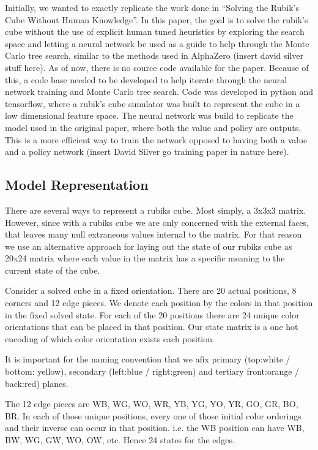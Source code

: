 \documentclass[10pt,twocolumn,letterpaper]{article}
\begin{document}
Initially, we wanted to exactly replicate the work done in “Solving the Rubik’s Cube Without Human Knowledge”. In this paper, the goal is to solve the rubik's cube without the use of explicit human tuned heuristics by exploring the search space and letting a neural network be used as a guide to help through the Monte Carlo tree search, similar to the methods used in AlphaZero (insert david silver stuff here). As of now, there is no source code available for the paper. Because of this, a code base needed to be developed to help iterate through the neural network training and Monte Carlo tree search. Code was developed in python and tensorflow, where a rubik's cube simulator was built to represent the cube in a low dimensional feature space. The neural network was build to replicate the model used in the original paper, where both the value and policy are outputs. This is a more efficient way to train the network opposed to having both a value and a policy network (insert David Silver go training paper in nature here).

\subsection{Model Representation}
There are several ways to represent a rubiks cube.  Most simply, a 3x3x3 matrix.  However, since with a rubiks cube we are only concerned with the external faces, that leaves many null extraneous values internal to the matrix.   For that reason we use an alternative approach for laying out the state of our rubiks cube as 20x24 matrix where each value in the matrix has a specific meaning to the current state of the cube. 

Consider a solved cube in a fixed orientation.  There are 20 actual positions, 8 corners and 12 edge pieces.  We denote each position by the colors in that position in the fixed solved state.  For each of the 20 positions there are 24 unique color orientations that can be placed in that position.  Our state matrix is a one hot encoding of which color orientation exists each position. 

It is important for the naming convention that we afix primary (top:white / bottom: yellow), secondary (left:blue / right:green) and tertiary front:orange / back:red) planes.  

The 12 edge pieces are WB, WG, WO, WR, YB, YG, YO, YR, GO, GR, BO, BR.  In each of those unique positions, every one of those initial color orderings and their inverse can occur in that position.  i.e. the WB position can have WB, BW, WG, GW, WO, OW, etc.  Hence 24 states for the edges.  
\end{document}
